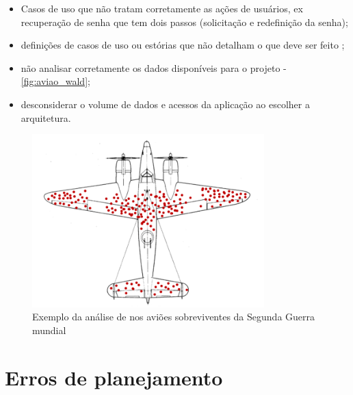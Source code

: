 \begin{itemize}
    \item Casos de uso que não tratam corretamente as ações de usuários, ex recuperação de senha que tem dois passos (solicitação e redefinição da senha);
    
    \item definições de casos de uso ou estórias que não detalham o que deve ser feito 
    \newline
    ;
    
    \item não analisar corretamente os dados disponíveis para o projeto \cite{boas_perguntas_dados} \cite{guerra-matematica} \cite{ellenberg2015poder} -  \autoref{fig:aviao_wald};

    
    \item desconsiderar o volume de dados e acessos da aplicação ao escolher a arquitetura.
\end{itemize}

\begin{figure}
    \centering
	\includegraphics[width=0.8\textwidth]{erros/aviao_wald.png}
    \caption{Exemplo da análise de  nos aviões sobreviventes da Segunda Guerra mundial}
    \label{fig:aviao_wald}
\end{figure}


\section{Erros de planejamento}

